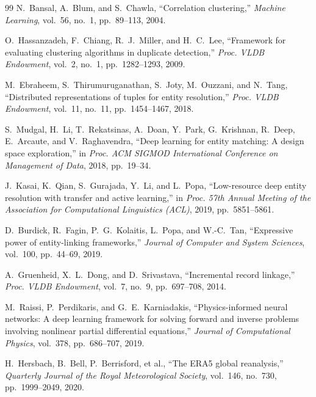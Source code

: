 \documentclass[12pt,a4paper]{report}
\begin{document}
\begin{thebibliography}{99}
 N.~Bansal, A.~Blum, and S.~Chawla, ``Correlation clustering,'' \emph{Machine Learning}, vol.~56, no.~1, pp.~89--113, 2004.

 O.~Hassanzadeh, F.~Chiang, R.~J.~Miller, and H.~C.~Lee, ``Framework for evaluating clustering algorithms in duplicate detection,'' \emph{Proc. VLDB Endowment}, vol.~2, no.~1, pp.~1282--1293, 2009.

 M.~Ebraheem, S.~Thirumuruganathan, S.~Joty, M.~Ouzzani, and N.~Tang, ``Distributed representations of tuples for entity resolution,'' \emph{Proc. VLDB Endowment}, vol.~11, no.~11, pp.~1454--1467, 2018.

 S.~Mudgal, H.~Li, T.~Rekatsinas, A.~Doan, Y.~Park, G.~Krishnan, R.~Deep, E.~Arcaute, and V.~Raghavendra, ``Deep learning for entity matching: A design space exploration,'' in \emph{Proc. ACM SIGMOD International Conference on Management of Data}, 2018, pp.~19--34.

 J.~Kasai, K.~Qian, S.~Gurajada, Y.~Li, and L.~Popa, ``Low-resource deep entity resolution with transfer and active learning,'' in \emph{Proc. 57th Annual Meeting of the Association for Computational Linguistics (ACL)}, 2019, pp.~5851--5861.

 D.~Burdick, R.~Fagin, P.~G.~Kolaitis, L.~Popa, and W.-C.~Tan, ``Expressive power of entity-linking frameworks,'' \emph{Journal of Computer and System Sciences}, vol.~100, pp.~44--69, 2019.

 A.~Gruenheid, X.~L.~Dong, and D.~Srivastava, ``Incremental record linkage,'' \emph{Proc. VLDB Endowment}, vol.~7, no.~9, pp.~697--708, 2014.

 M.~Raissi, P.~Perdikaris, and G.~E.~Karniadakis, ``Physics-informed neural networks: A deep learning framework for solving forward and inverse problems involving nonlinear partial differential equations,'' \emph{Journal of Computational Physics}, vol.~378, pp.~686--707, 2019.

 H.~Hersbach, B.~Bell, P.~Berrisford, et al., ``The ERA5 global reanalysis,'' \emph{Quarterly Journal of the Royal Meteorological Society}, vol.~146, no.~730, pp.~1999--2049, 2020.

\end{thebibliography}
\end{document}
